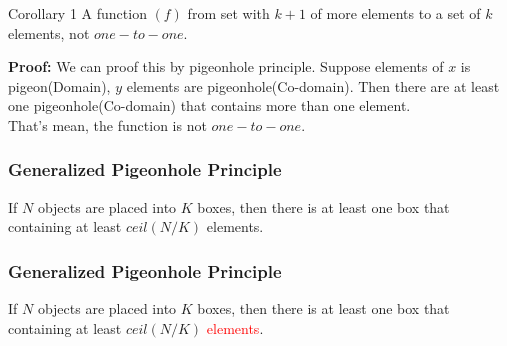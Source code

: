 \documentclass{beamer}
\begin{document}
\begin{frame}
\begin{block}{Corollary 1}
A function $(f)$ from set with $k+1$ of more elements to a set of $k$ elements, not $one-to-one$.
\end{block}
\textbf{Proof:} We can proof this by pigeonhole principle. Suppose elements of $x$ is pigeon(Domain), $y$ elements are pigeonhole(Co-domain). Then there are at least one pigeonhole(Co-domain) that contains more than one element.\\
That's mean, the function is not $one-to-one$.
\end{frame}

\begin{frame}
\frametitle{Generalized Pigeonhole Principle}
If $N$ objects are placed into $K$ boxes, then there is at least one box that containing at least $ceil(N/K)$ elements.
\end{frame}

\begin{frame}
\frametitle{Generalized Pigeonhole Principle}
If $N$ objects are placed into $K$ boxes, then there is at least one box that containing at least $ceil(N/K)$ \textcolor{red}{elements}.
\end{frame}
\end{document}
